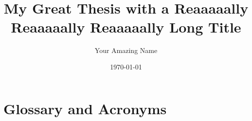 \documentclass[
	verbose,
	english,
	type=bachelor-thesis, %
	license=CCBY, %
	paper=a4,  %
]{thesis}
\title{My Great Thesis with a Reaaaaally Reaaaaally Reaaaaally Long Title}
\author{Your Amazing Name}
\date{\today}
\begin{document}
\hideindraft{
	\frontmatter
		\maketitle
	
		
		
	
		\tableofcontents
		{
			\listoffigures
			\listoftables
		}
	}
	
	\mainmatter
	
	
	
	
	
	

	\backmatter
	\printbibliography

	\let\clearpage\newpage
	\let\cleardoublepage\newpage
	\chapter{Glossary and Acronyms}
	\printglossaries
\end{document}
